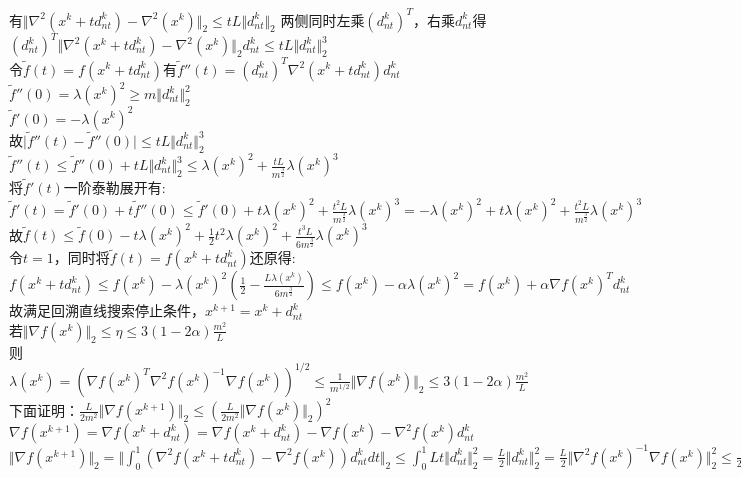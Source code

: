 \documentclass{article}
\begin{document}
有$\Vert \nabla^2(x^k + t d^k_{nt}) - \nabla^2(x^k)\Vert_2 \leq tL \Vert d^k_{nt} \Vert_2$
两侧同时左乘$( d^k_{nt})^T$，右乘$ d^k_{nt}$得\\
$( d^k_{nt})^T \Vert \nabla^2(x^k + t d^k_{nt}) - \nabla^2(x^k)\Vert_2 d^k_{nt} \leq tL \Vert d^k_{nt} \Vert_2^3 $\\
令$\tilde{f}(t) = f(x^k + td^k_{nt})$有$\tilde{f}''(t) = ( d^k_{nt})^T\nabla^2(x^k + t d^k_{nt}) d^k_{nt}$\\
$\tilde{f}''(0) = \lambda(x^k)^2 \geq m\Vert d^k_{nt} \Vert_2^2$\\
$\tilde{f}'(0) = -\lambda(x^k)^2$\\
故$\vert \tilde{f}''(t) - \tilde{f}''(0)  \vert \leq tL \Vert d^k_{nt} \Vert_2^3$\\
$\tilde{f}''(t) \leq \tilde{f}''(0) + tL \Vert d^k_{nt} \Vert_2^3 \leq \lambda(x^k)^2 + \frac{tL}{m^{\frac{3}{2}}}\lambda(x^k)^3$\\
将$\tilde{f}'(t)$一阶泰勒展开有:$\tilde{f}'(t) = \tilde{f}'(0) + t \tilde{f}''(0) \leq \tilde{f}'(0) + t\lambda(x^k)^2 + \frac{t^2L}{m^{\frac{3}{2}}}\lambda(x^k)^3 = -\lambda(x^k)^2 + t\lambda(x^k)^2 + \frac{t^2L}{m^{\frac{3}{2}}}\lambda(x^k)^3 $\\
故$\tilde{f}(t) \leq \tilde{f}(0) - t\lambda(x^k)^2 + \frac{1}{2}t^2 \lambda(x^k)^2+ \frac{t^3L}{6m^{\frac{3}{2}}}\lambda(x^k)^3 $\\
令$t = 1$，同时将$\tilde{f}(t) =f(x^k + td^k_{nt}) $还原得:\\
$f(x^k + td^k_{nt}) \leq f(x^k) - \lambda(x^k)^2 (\frac{1}{2} - \frac{L \lambda(x^k)}{6m^{\frac{3}{2}}})\leq f(x^k) - \alpha \lambda(x^k)^2 = f(x^k) + \alpha \nabla f(x^k)^T d^k_{nt}$\\
故满足回溯直线搜索停止条件，$x^{k+1} = x^k + d^k_{nt}$\\
若$\Vert \nabla f(x^k) \Vert_2 \leq \eta \leq 3(1-2\alpha)\frac{m^2}{L}$\\
则$\lambda(x^k) = (\nabla f(x^k)^T \nabla^2f(x^k)^{-1} \nabla f(x^k) )^{1/2} \leq \frac{1}{m^{1/2}} \Vert \nabla f(x^k) \Vert_2 \leq 3(1-2\alpha)\frac{m^2}{L}$\\
下面证明：$\frac{L}{2m^2}\Vert  \nabla f(x^{k+1}) \Vert_2 \leq (\frac{L}{2m^2}\Vert  \nabla f(x^k) \Vert_2)^2$\\
$\nabla f(x^{k+1}) = \nabla f(x^k + d^k_{nt}) = \nabla f(x^k + d^k_{nt}) - \nabla f(x^k) - \nabla^2 f(x^k)d^k_{nt}$\\
$\Vert \nabla f(x^{k+1}) \Vert_2 = \Vert \int_{0}^{1} (\nabla^2 f(x^k + td^k_{nt}) - \nabla^2 f(x^k))d^k_{nt} dt \Vert_2 \leq \int_{0}^{1} Lt\Vert d^k_{nt}\Vert_2^2 = \frac{L}{2}\Vert d^k_{nt}\Vert_2^2 = \frac{L}{2}\Vert \nabla ^2 f(x^k) ^{-1} \nabla f(x^k)\Vert_2^2 \leq \frac{L}{2m^2}\Vert  \nabla f(x^k) \Vert_2^2$\\
\end{document}
